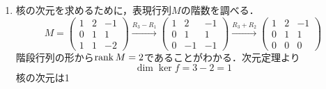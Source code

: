 \documentclass[dvipdfmx]{jsreport}
\begin{document}
\begin{souanswer}
\begin{enumerate}
\begin{enumerate}
	\item 写像$f$が線型写像であることを示すためには任意のベクトル$\bm{u}, \bm{v}\in \R^3$とスカラー$k\in \R$に対して以下の条件\ref{law:加法性}, \ref{law:斉次性}
	この写像は行列$M= \begin{pmatrix}1& 2& -1\\ 0& 1& 1\\ 1& 1& -2\end{pmatrix}$を用いて$f(\bm{v})= M\bm{v}$と表現できる．行列とベクトルの積の性質より
\begin{enumerate}
	\item $M(\bm{u}+ \bm{v})= M\bm{u}+ M\bm{v}$
	\item $M(k\bm{u})= kM\bm{u}$
\end{enumerate}
	が成り立つため，$f$は線型写像．
\end{enumerate}
	\item 核の次元を求めるために，表現行列$M$の階数を調べる．
\begin{equation*}
	M= \begin{pmatrix}1& 2& -1\\ 0& 1& 1\\ 1& 1& -2\end{pmatrix}
\stackrel{R_3- R_1}{\longrightarrow} \begin{pmatrix}1& 2& -1\\ 0& 1& 1\\ 0& -1& -1\end{pmatrix}\stackrel{R_3+ R_2}{\longrightarrow}
\begin{pmatrix}1& 2& -1\\ 0& 1& 1\\ 0& 0& 0\end{pmatrix}
\end{equation*}
	階段行列の形から$\operatorname{rank}{M}= 2$であることがわかる．次元定理より
\begin{equation*}
	\dim{\ker{f}}= 3- 2= 1
\end{equation*}
	核の次元は1
\end{enumerate}
\end{souanswer}
\end{document}
